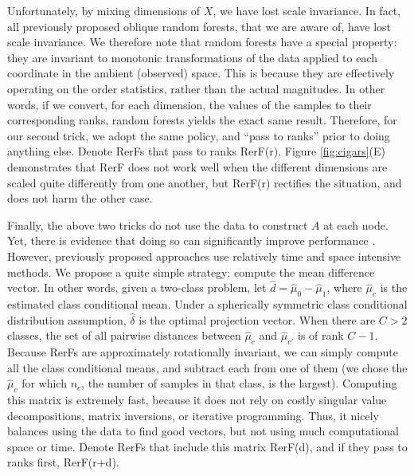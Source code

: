 \documentclass{article} %
\providecommand{\mh}[1]{\hat{#1}}
\begin{document}
Unfortunately, by mixing dimensions of $X$, we have lost scale invariance.  In fact, all previously proposed oblique random forests, that we are aware of, have lost scale invariance.  We therefore note that random forests have a special property: they are invariant to monotonic transformations of the data applied to each coordinate in the ambient (observed) space.  This is because they are effectively operating on the order statistics, rather than the actual magnitudes.  In other words, if we convert, for each dimension, the values of the samples to their corresponding ranks, random forests yields the exact same result. Therefore, for our second trick, we adopt the same policy, and ``pass to ranks'' prior to doing anything else.   Denote RerFs that pass to ranks RerF(r).
Figure \ref{fig:cigars}(E) demonstrates that RerF does not work well when the different dimensions are scaled quite differently from one another, but RerF(r) rectifies the situation, and does not harm the other case. 

Finally, the above two tricks do not use the data to construct $A$ at each node.  Yet, there is  evidence that doing so can significantly improve performance \cite{Heath1993}.  However, previously proposed approaches use relatively time and space intensive methods.  We propose a quite simple strategy: compute the mean difference vector.  In other words, given a two-class problem, let $\mh{d}=\mh{\mu}_0-\mh{\mu}_1$, where $\mh{\mu}_c$ is the estimated class conditional mean.  Under a spherically symmetric class conditional distribution assumption, $\mh{\delta}$ is the optimal projection vector.  When there are $C>2$ classes, the set of all pairwise distances between $\mh{\mu}_c$ and $\mh{\mu}_{c'}$ is of rank $C-1$.  Because RerFs are approximately rotationally invariant, we can simply compute all the class conditional means, and subtract each from one of them (we chose the $\mh{\mu}_c$ for which $n_c$, the number of samples in that class, is the largest).
Computing this matrix is extremely fast, because it does not rely on costly singular value decompositions, matrix inversions, or iterative programming.  Thus, it nicely balances using the data to find good vectors, but not using much computational space or time. Denote RerFs that include this matrix RerF(d), and if they pass to ranks first, RerF(r+d).
\end{document}

